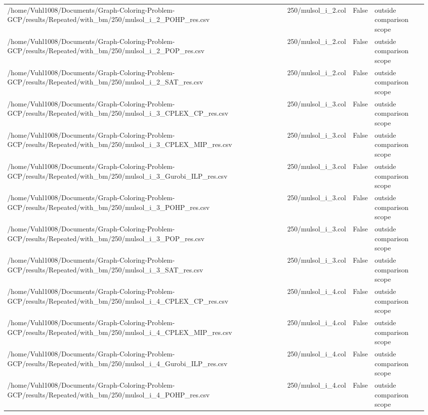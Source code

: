 \begin{table}[htbp]
\begin{tabular}{llll}
/home/Vuhl1008/Documents/Graph-Coloring-Problem-GCP/results/Repeated/with\_bm/250/mulsol\_i\_2\_POHP\_res.csv & 250/mulsol\_i\_2.col & False & outside comparison scope \\
/home/Vuhl1008/Documents/Graph-Coloring-Problem-GCP/results/Repeated/with\_bm/250/mulsol\_i\_2\_POP\_res.csv & 250/mulsol\_i\_2.col & False & outside comparison scope \\
/home/Vuhl1008/Documents/Graph-Coloring-Problem-GCP/results/Repeated/with\_bm/250/mulsol\_i\_2\_SAT\_res.csv & 250/mulsol\_i\_2.col & False & outside comparison scope \\
/home/Vuhl1008/Documents/Graph-Coloring-Problem-GCP/results/Repeated/with\_bm/250/mulsol\_i\_3\_CPLEX\_CP\_res.csv & 250/mulsol\_i\_3.col & False & outside comparison scope \\
/home/Vuhl1008/Documents/Graph-Coloring-Problem-GCP/results/Repeated/with\_bm/250/mulsol\_i\_3\_CPLEX\_MIP\_res.csv & 250/mulsol\_i\_3.col & False & outside comparison scope \\
/home/Vuhl1008/Documents/Graph-Coloring-Problem-GCP/results/Repeated/with\_bm/250/mulsol\_i\_3\_Gurobi\_ILP\_res.csv & 250/mulsol\_i\_3.col & False & outside comparison scope \\
/home/Vuhl1008/Documents/Graph-Coloring-Problem-GCP/results/Repeated/with\_bm/250/mulsol\_i\_3\_POHP\_res.csv & 250/mulsol\_i\_3.col & False & outside comparison scope \\
/home/Vuhl1008/Documents/Graph-Coloring-Problem-GCP/results/Repeated/with\_bm/250/mulsol\_i\_3\_POP\_res.csv & 250/mulsol\_i\_3.col & False & outside comparison scope \\
/home/Vuhl1008/Documents/Graph-Coloring-Problem-GCP/results/Repeated/with\_bm/250/mulsol\_i\_3\_SAT\_res.csv & 250/mulsol\_i\_3.col & False & outside comparison scope \\
/home/Vuhl1008/Documents/Graph-Coloring-Problem-GCP/results/Repeated/with\_bm/250/mulsol\_i\_4\_CPLEX\_CP\_res.csv & 250/mulsol\_i\_4.col & False & outside comparison scope \\
/home/Vuhl1008/Documents/Graph-Coloring-Problem-GCP/results/Repeated/with\_bm/250/mulsol\_i\_4\_CPLEX\_MIP\_res.csv & 250/mulsol\_i\_4.col & False & outside comparison scope \\
/home/Vuhl1008/Documents/Graph-Coloring-Problem-GCP/results/Repeated/with\_bm/250/mulsol\_i\_4\_Gurobi\_ILP\_res.csv & 250/mulsol\_i\_4.col & False & outside comparison scope \\
/home/Vuhl1008/Documents/Graph-Coloring-Problem-GCP/results/Repeated/with\_bm/250/mulsol\_i\_4\_POHP\_res.csv & 250/mulsol\_i\_4.col & False & outside comparison scope \\

\end{tabular}
\end{table}
